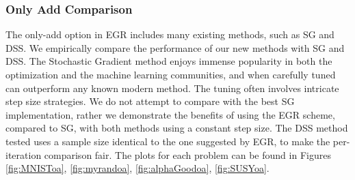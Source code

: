 \documentclass[11pt]{article}
\begin{document}
  
  
  
  
  
  
   \subsubsection{Only Add Comparison}

   
   The only-add option in EGR includes many existing methods, such as SG and DSS. We empirically compare the performance of our new methods with SG and DSS. The Stochastic Gradient method enjoys immense popularity in both the optimization and the machine learning communities, and when carefully tuned can outperform any known modern method. The tuning often involves intricate step size strategies. We do not attempt to compare with the best SG implementation, rather we demonstrate the benefits of using the EGR scheme, compared to SG, with both methods using a constant step size. The DSS method tested uses a sample size identical to the one suggested by EGR, to make the per-iteration comparison fair. The plots for each problem can be found in Figures \ref{fig:MNISToa},  \ref{fig:myrandoa},  \ref{fig:alphaGoodoa},  \ref{fig:SUSYoa}.
   
\end{document}
